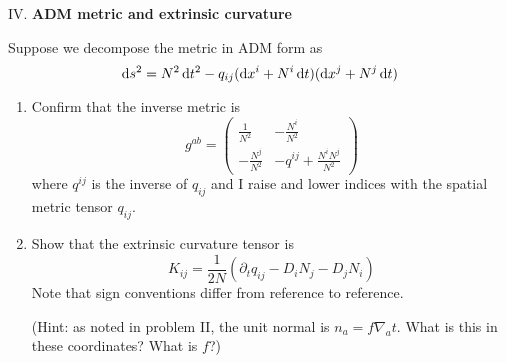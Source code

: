 \medbreak\noindent{}IV. \textbf{ADM metric and extrinsic curvature}\medbreak

Suppose we decompose the metric in ADM form as
\begin{equation*}
\mathrm{d} s^{2} = N^{2}\,\mathrm{d} t^{2} - q_{ij}(\mathrm{d} x^{i} + N^{i}\,\mathrm{d} t)(\mathrm{d} x^{j} + N^{j}\,\mathrm{d} t)
\end{equation*}
\begin{enumerate}[label=(\alph*),nosep]
\item Confirm that the inverse metric is
  $$g^{ab} = \begin{pmatrix}\frac{1}{N^{2}} & -\frac{N^{i}}{N^{2}}\\-\frac{N^{j}}{N^{2}} & -q^{ij} + \frac{N^{i}N^{j}}{N^{2}} \end{pmatrix}$$
  where $q^{ij}$ is the inverse of $q_{ij}$ and I raise and lower
  indices with the spatial metric tensor $q_{ij}$.
\item Show that the extrinsic curvature tensor is
  \begin{equation*}
K_{ij} = \frac{1}{2N}\left(\partial_{t}q_{ij} - D_{i}N_{j} - D_{j}N_{i}\right)
  \end{equation*}
  Note that sign conventions differ from reference to reference.

  (Hint: as noted in problem II, the unit normal is $n_{a} = f\nabla_{a}t$. What is this in these coordinates? What is $f$?)
\end{enumerate}
